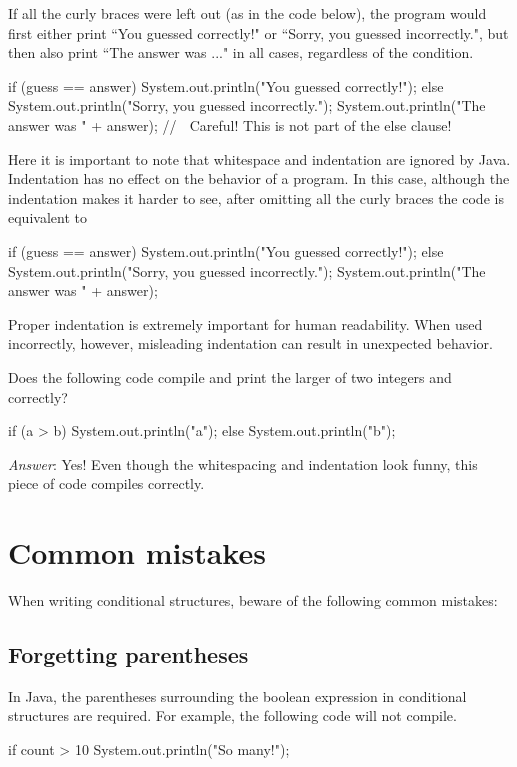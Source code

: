 \noindent If all the curly braces were left out (as in the code below), the program would first either print ``You guessed correctly!" or ``Sorry, you guessed incorrectly.", but then also print ``The answer was ..." in all cases, regardless of the condition.

\begin{code}
if (guess == answer)
    System.out.println("You guessed correctly!");
else
    System.out.println("Sorry, you guessed incorrectly.");
    System.out.println("The answer was " + answer); 
    // ^^^ Careful! This is not part of the else clause!
\end{code}

Here it is important to note that whitespace and indentation are ignored by Java. Indentation has no effect on the behavior of a program. In this case, although the indentation makes it harder to see, after omitting all the curly braces the code is equivalent to 

\begin{code}
if (guess == answer){
    System.out.println("You guessed correctly!");
} else {
    System.out.println("Sorry, you guessed incorrectly.");
}
System.out.println("The answer was " + answer); 
\end{code}

Proper indentation is extremely important for human readability. When used incorrectly, however, misleading indentation can result in unexpected behavior.

\begin{example}
Does the following code compile and print the larger of two integers  and  correctly?

\begin{code}
if (a > b)      System.out.println("a");
else {
System.out.println("b");
}
\end{code}

\emph{Answer}: Yes! Even though the whitespacing and indentation look funny, this piece of code compiles correctly.
\end{example}

\section{Common mistakes}
When writing conditional structures, beware of the following common  mistakes:

\subsection{Forgetting parentheses}
In Java, the parentheses surrounding the boolean expression in conditional structures are required. For example, the following code will not compile.
\begin{code}
if count > 10
    System.out.println("So many!");
\end{code}

